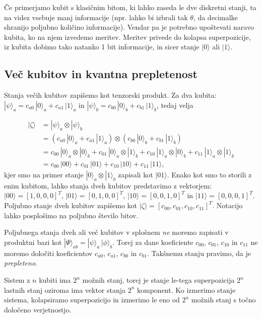 \documentclass[12pt]{article}
\begin{document}
\par

Če primerjamo kubit s klasičnim bitom, ki lahko zaseda le dve diskretni stanji, ta na videz vsebuje manj informacije (npr. lahko bi izbrali tak $\theta$, da decimalke shranijo poljubno količino informacije). Vendar pa je potrebno upoštevati naravo kubita, ko na njem izvedemo meritev. Meritev privede do kolapsa superpozicije, iz kubita dobimo tako natanko 1 bit informacije, in sicer stanje $| 0 \rangle$ ali $| 1 \rangle$. \cite{nielsenQuantumComputationQuantum2012}

\subsection{Več kubitov in kvantna prepletenost}

Stanja večih kubitov zapišemo kot tenzorski produkt. Za dva kubita: $| \psi \rangle_a = c_{a0} \, | 0 \rangle_a + c_{a1} \, | 1 \rangle_a$ in $| \psi \rangle_b = c_{b0} \, | 0 \rangle_b + c_{b1} \, | 1 \rangle_b$, tedaj velja
 
\begin{equation} \label{eq1}
\begin{split}
| \zeta \rangle & = | \psi \rangle_a \otimes | \psi \rangle_b\\
 & = (c_{a0} \, | 0 \rangle_a + c_{a1} \, | 1 \rangle_a) \otimes (c_{b0} \, | 0 \rangle_b + c_{b1} \, | 1 \rangle_b) \\
 & = c_{00} \, | 0 \rangle_a \otimes | 0 \rangle_b + 
c_{01} \, | 0 \rangle_a \otimes | 1 \rangle_b + c_{10} \, | 1 \rangle_a \otimes | 0 \rangle_b + c_{11} \, | 1 \rangle_a \otimes | 1 \rangle_b \\ 
 & =  c_{00} \, | 00 \rangle + c_{01} \, | 01 \rangle + c_{10} \, | 10 \rangle + c_{11} \, | 11 \rangle,
\end{split}
\end{equation}
kjer smo na primer stanje $ | 0 \rangle_a \otimes | 1 \rangle_b $ zapisali kot $ | 01 \rangle $. Enako kot smo to storili z enim kubitom, lahko stanja dveh kubitov predstavimo z vektorjem: $ | 00 \rangle = [1,0,0,0]^T $, $ | 01 \rangle = [0,1,0,0]^T $, $ | 10 \rangle = [0,0,1,0]^T $ in $ | 11 \rangle = [0,0,0,1]^T $. Poljubno stanje dveh kubitov zapišemo kot $ | \zeta \rangle = [c_{00}, c_{01}, c_{10}, c_{11}]^T $. Notacijo lahko posplošimo na poljubno število bitov. \cite{pompeKvantniAlgoritmi2022}

\par

Poljubnega stanja dveh ali več kubitov v splošnem \emph{ne} moremo zapisati v produktni bazi kot $ | \Psi \rangle_{ab} = | \psi \rangle_a \, |\phi \rangle_b$. Torej za dane koeficiente $c_{00}$, $c_{01}$, $c_{10}$ in $c_{11}$ ne moremo določiti koeficientov $c_{a0}$, $c_{a1}$, $c_{b0}$ in $c_{b1}$. Takšnemu stanju pravimo, da je \emph{prepleteno}. \cite{pompeKvantniAlgoritmi2022}
\par Sistem z $n$ kubiti ima $2^n$ možnih stanj, torej je stanje le-tega superpozicija $2^n$ lastnih stanj oziroma ima vektor stanja $2^n$ komponent. Ko izmerimo stanje sistema, kolapsiramo superpozicijo in izmerimo le eno od $2^n$ možnih stanj s točno določeno verjetnostjo. \cite{pompeKvantniAlgoritmi2022}
\end{document}
